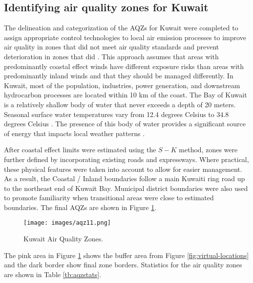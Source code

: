 \subsection{Identifying air quality zones for Kuwait}

 The delineation and categorization of the AQZs for Kuwait were completed to assign appropriate control technologies to local air emission processes to improve air quality in zones that did not meet air quality standards and prevent deterioration in zones that did \citep{Carr2012}. This approach assumes that areas with predominantly coastal effect winds have different exposure risks than areas with predominantly inland winds and that they should be managed differently.  In Kuwait, most of the population, industries, power generation, and downstream hydrocarbon processes are located within 10 km of the coast.  The Bay of Kuwait is a relatively shallow body of water that never exceeds a depth of 20 meters.  Seasonal surface water temperatures vary from 12.4 degrees Celsius to 34.8 degrees Celsius \citep{Al-Mutairi2014}.  The presence of this body of water provides a significant source of energy that impacts local weather patterns \citep{Mizak2007, Panin2005}. 

After coastal effect limits were estimated using the $S-K$ method, zones were further defined by incorporating existing roads and expressways.  Where practical, these physical features were taken into account to allow for easier management.  As a result, the Coastal / Inland boundaries follow a main Kuwaiti ring road up to the northeast end of Kuwait Bay.  Municipal district boundaries were also used to promote familiarity when transitional areas were close to estimated boundaries.  The final AQZs are shown in Figure \ref{fig:kuwaitzones}.

%
\begin{figure}[H]
\centering
\texttt{[image: images/aqz11.png]} 
\caption{Kuwait Air Quality Zones.}
\label{fig:kuwaitzones}
\end{figure}
%

The pink area in Figure \ref{fig:kuwaitzones} shows the buffer area from Figure \ref{fig:virtual-locations} and the dark border show final zone borders. Statistics for the air quality zones are shown in Table \ref{tb:aqzstats}.

